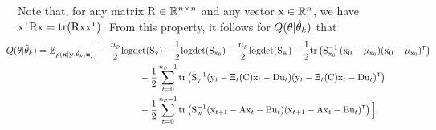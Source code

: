 Note that, for any matrix ${ \mathrm{R} }\in{\mathbb{R}}^{n\times n}$ and any vector ${ \mathrm{x} }\in{\mathbb{R}}^n$, we have $\vcx^\tr\mxR\vcx = \trace(\mxR\vcx\vcx^\tr)$. 
From this property, it follows for $Q({ \mathrm{\theta} }|\hat{{ \mathrm{\theta} }}_k)$ that
\begin{equation}\label{eq:Q function2}
    \begin{split}\!\!\!\!\!\!\!\!
        Q(\vctheta|\hat{\vctheta}_k) 
        = & \,\,
        \mathbb{E}_{p(\mathbf{x}|\mathbf{y},\hat{\vctheta}_k,\mathbf{u})}
        \Big[
        -\frac{\nD}{2} \logdet(\mxS_\vcv) 
        -\frac{1}{2}   \logdet(\mxS_{\vcx_0})
        -\frac{\nD}{2} \logdet(\mxS_\vcw) 
        -\frac{1}{2}\trace\left(\mxS_{\vcx_0}^{-1}\, (\vcx_0-\vcmu_{\vcx_0}) (\vcx_0-\vcmu_{\vcx_0})^\tr\right)
        \\ &
        \qquad \qquad \qquad \qquad \qquad 
        -\frac{1}{2} \sum_{t=0}^{\nD-1} \trace\left(\mxS_\vcv^{-1} (\vcy_t - \Xi_t(\mxC) \vcx_t - \mxD \vcu_t) (\vcy_t - \Xi_t(\mxC) \vcx_t - \mxD \vcu_t)^\tr\right) 
        \\ &
        \qquad \qquad \qquad \qquad \qquad 
        -\frac{1}{2} \sum_{t=0}^{\nD-1}\trace\left(\mxS_\vcw^{-1} (\vcx_{t+1} - \mxA \vcx_t - \mxB \vcu_t) (\vcx_{t+1} - \mxA \vcx_t - \mxB \vcu_t)^\tr\right)
        \Big].
    \end{split}\!\!\!\!\!\!
\end{equation}
